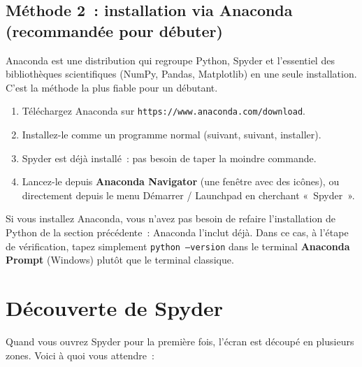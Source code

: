 \documentclass[12pt,a4paper]{article}
\begin{document}
	\subsection{Méthode 2~: installation via Anaconda (recommandée pour débuter)}
	
	Anaconda est une distribution qui regroupe Python, Spyder et l'essentiel des bibliothèques scientifiques (NumPy, Pandas, Matplotlib) en une seule installation. C'est la méthode la plus fiable pour un débutant.
	
	\begin{etape}
		\begin{enumerate}
			\item Téléchargez Anaconda sur \texttt{https://www.anaconda.com/download}.
			\item Installez-le comme un programme normal (suivant, suivant, installer).
			\item Spyder est déjà installé~: pas besoin de taper la moindre commande.
			\item Lancez-le depuis \textbf{Anaconda Navigator} (une fenêtre avec des icônes), ou directement depuis le menu Démarrer / Launchpad en cherchant «~Spyder~».
		\end{enumerate}
	\end{etape}
	
	\begin{astuce}
		Si vous installez Anaconda, vous n'avez pas besoin de refaire l'installation de Python de la section précédente~: Anaconda l'inclut déjà. Dans ce cas, à l'étape de vérification, tapez simplement \texttt{python --version} dans le terminal \textbf{Anaconda Prompt} (Windows) plutôt que le terminal classique.
	\end{astuce}
	
	\section{Découverte de Spyder}
	
	Quand vous ouvrez Spyder pour la première fois, l'écran est découpé en plusieurs zones. Voici à quoi vous attendre~:
	
\end{document}
